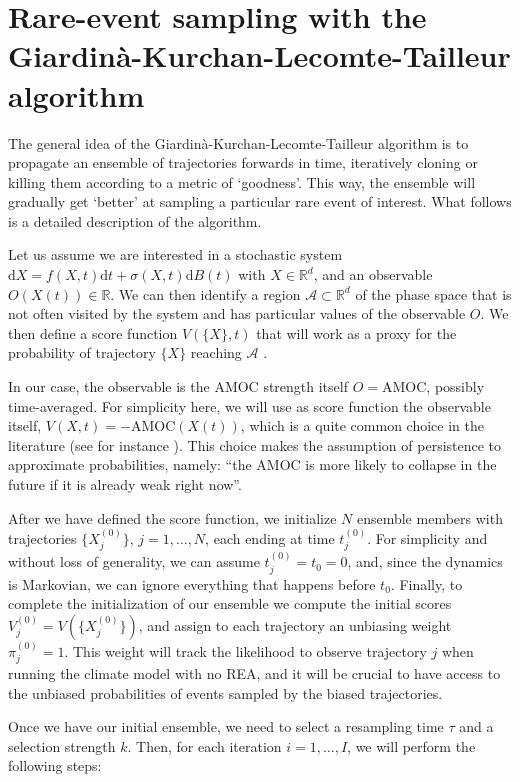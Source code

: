 \section{Rare-event sampling with the Giardin\`a-Kurchan-Lecomte-Tailleur algorithm}\label{AppREA}

The general idea of the Giardin\`a-Kurchan-Lecomte-Tailleur algorithm \cite{GIA11} is to propagate an ensemble of trajectories forwards in time, iteratively cloning or killing them according to a metric of `goodness'. This way, the ensemble will gradually get `better' at sampling a particular rare event of interest. What follows is a detailed description of the algorithm.

Let us assume we are interested in a stochastic system $\text{d} X = f(X, t) \text{d} t + \sigma(X, t) \text{d} B(t)$ with $X \in \mathbb{R}^d$, and an observable $O(X(t)) \in \mathbb{R}$. We can then identify a region $\mathcal{A} \subset \mathbb{R}^d$ of the phase space that is not often visited by the system and has particular values of the observable $O$.
We then define a score function $V(\{X\}, t)$ that will work as a proxy for the probability of trajectory $\{X\}$ reaching $\mathcal{A}$ \cite{CHR20}.

In our case, the observable is the AMOC strength itself $O = \mathrm{AMOC}$, possibly time-averaged. For simplicity here, we will use as score function the observable itself, $V({X}, t) = -\mathrm{AMOC}(X(t))$, which is a quite common choice in the literature (see for instance \cite{GKTL-Ly,Ragone24}). This choice makes the assumption of persistence to approximate probabilities, namely: ``the AMOC is more likely to collapse in the future if it is already weak right now''.

After we have defined the score function, we initialize $N$ ensemble members with trajectories $\{X^{(0)}_j\}, \, j = 1, \ldots, N$, each ending at time $t^{(0)}_j$. For simplicity and without loss of generality, we can assume $t^{(0)}_j = t_0 = 0$, and, since the dynamics is Markovian, we can ignore everything that happens before $t_0$.
Finally, to complete the initialization of our ensemble we compute the initial scores $V_j^{(0)} = V(\{X^{(0)}_j\})$, and assign to each trajectory an unbiasing weight $\pi_j^{(0)} = 1$. This weight will track the likelihood to observe trajectory $j$ when running the climate model with no REA, and it will be crucial to have access to the unbiased probabilities of events sampled by the biased trajectories.

Once we have our initial ensemble, we need to select a resampling time $\tau$ and a selection strength $k$. Then, for each iteration $i = 1, \ldots, I$, we will perform the following steps:

